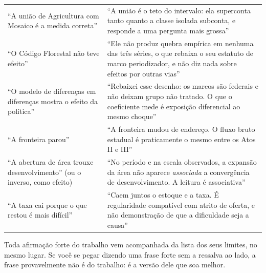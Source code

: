 \begin{longtable}{@{}p{6.5cm}p{8.2cm}@{}}
\addlinespace
``A união de Agricultura com Mosaico é a medida correta'' &
``A união é o teto do intervalo: ela superconta tanto quanto a classe isolada
subconta, e responde a uma pergunta mais grossa'' \\
\addlinespace
``O Código Florestal não teve efeito'' &
``Ele não produz quebra empírica em nenhuma das três séries, o que rebaixa o seu
estatuto de marco periodizador, e não diz nada sobre efeitos por outras
vias'' \\
\addlinespace
``O modelo de diferenças em diferenças mostra o efeito da política'' &
``Rebaixei esse desenho: os marcos são federais e não deixam grupo não tratado.
O que o coeficiente mede é exposição diferencial ao mesmo choque'' \\
\addlinespace
``A fronteira parou'' &
``A fronteira mudou de endereço. O fluxo bruto estadual é praticamente o mesmo
entre os Atos II e III'' \\
\addlinespace
``A abertura de área trouxe desenvolvimento'' (ou o inverso, como efeito) &
``No período e na escala observados, a expansão da área não aparece
\emph{associada} a convergência de desenvolvimento. A leitura é associativa'' \\
\addlinespace
``A taxa cai porque o que restou é mais difícil'' &
``Caem juntos o estoque e a taxa. É regularidade compatível com atrito de
oferta, e não demonstração de que a dificuldade seja a causa'' \\
\bottomrule
\end{longtable}

\vspace{12pt}
\begin{nabanca}
Toda afirmação forte do trabalho vem acompanhada da lista dos seus limites, no
mesmo lugar. Se você se pegar dizendo uma frase forte sem a ressalva ao lado, a
frase provavelmente não é do trabalho: é a versão dele que soa melhor.
\end{nabanca}
